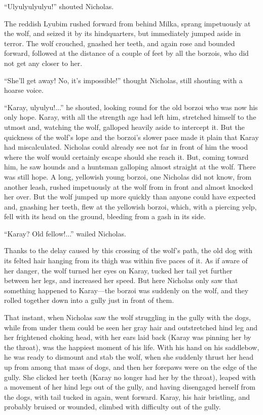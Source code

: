 ``Ulyulyulyulyu!'' shouted Nicholas.

The reddish Lyubim rushed forward from behind Milka, sprang
impetuously at the wolf, and seized it by its hindquarters, but
immediately jumped aside in terror. The wolf crouched, gnashed
her teeth, and again rose and bounded forward, followed at the
distance of a couple of feet by all the borzois, who did not get
any closer to her.

``She'll get away! No, it's impossible!'' thought Nicholas, still
shouting with a hoarse voice.

``Karay, ulyulyu!...'' he shouted, looking round for the old
borzoi who was now his only hope. Karay, with all the strength
age had left him, stretched himself to the utmost and, watching
the wolf, galloped heavily aside to intercept it. But the
quickness of the wolf's lope and the borzoi's slower pace made it
plain that Karay had miscalculated.  Nicholas could already see
not far in front of him the wood where the wolf would certainly
escape should she reach it. But, coming toward him, he saw hounds
and a huntsman galloping almost straight at the wolf.  There was
still hope. A long, yellowish young borzoi, one Nicholas did not
know, from another leash, rushed impetuously at the wolf from in
front and almost knocked her over. But the wolf jumped up more
quickly than anyone could have expected and, gnashing her teeth,
flew at the yellowish borzoi, which, with a piercing yelp, fell
with its head on the ground, bleeding from a gash in its side.

``Karay? Old fellow!...'' wailed Nicholas.

Thanks to the delay caused by this crossing of the wolf's path,
the old dog with its felted hair hanging from its thigh was
within five paces of it. As if aware of her danger, the wolf
turned her eyes on Karay, tucked her tail yet further between her
legs, and increased her speed. But here Nicholas only saw that
something happened to Karay---the borzoi was suddenly on the
wolf, and they rolled together down into a gully just in front of
them.

That instant, when Nicholas saw the wolf struggling in the gully
with the dogs, while from under them could be seen her gray hair
and outstretched hind leg and her frightened choking head, with
her ears laid back (Karay was pinning her by the throat), was the
happiest moment of his life. With his hand on his saddlebow, he
was ready to dismount and stab the wolf, when she suddenly thrust
her head up from among that mass of dogs, and then her forepaws
were on the edge of the gully. She clicked her teeth (Karay no
longer had her by the throat), leaped with a movement of her hind
legs out of the gully, and having disengaged herself from the
dogs, with tail tucked in again, went forward. Karay, his hair
bristling, and probably bruised or wounded, climbed with
difficulty out of the gully.

